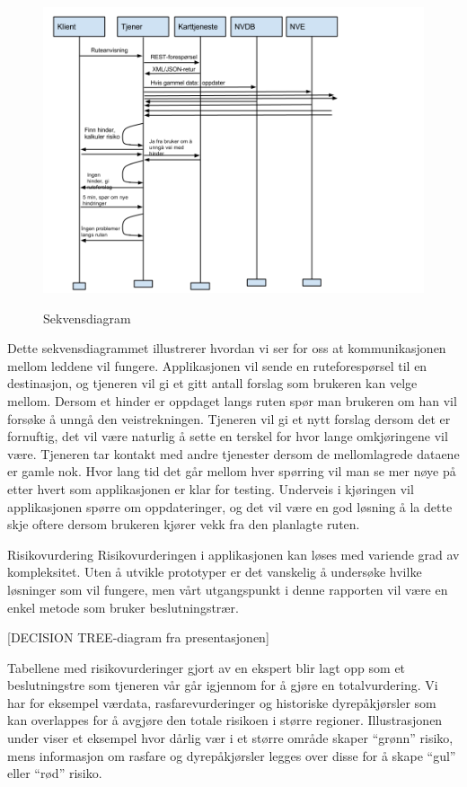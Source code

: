 \documentclass[a4paper,norsk,oneside]{book}
\begin{document}
\begin{figure}[H]
\centering
\includegraphics[scale=0.5]{figs/Sekvensdiagram.png}
\label{sekvensdiagram}
\caption{Sekvensdiagram}
\end{figure}

Dette sekvensdiagrammet illustrerer hvordan vi ser for oss at kommunikasjonen mellom leddene vil fungere. Applikasjonen vil sende en ruteforespørsel til en destinasjon, og tjeneren vil gi et gitt antall forslag som brukeren kan velge mellom. Dersom et hinder er oppdaget langs ruten spør man brukeren om han vil forsøke å unngå den veistrekningen. Tjeneren vil gi et nytt forslag dersom det er fornuftig, det vil være naturlig å sette en terskel for hvor lange omkjøringene vil være.
Tjeneren tar kontakt med andre tjenester dersom de mellomlagrede dataene er gamle nok. Hvor lang tid det går mellom hver spørring vil man se mer nøye på etter hvert som applikasjonen er klar for testing.
Underveis i kjøringen vil applikasjonen spørre om oppdateringer, og det vil være en god løsning å la dette skje oftere dersom brukeren kjører vekk fra den planlagte ruten.

Risikovurdering
Risikovurderingen i applikasjonen kan løses med variende grad av kompleksitet. Uten å utvikle prototyper er det vanskelig å undersøke hvilke løsninger som vil fungere, men vårt utgangspunkt i denne rapporten vil være en enkel metode som bruker beslutningstrær.

[DECISION TREE-diagram fra presentasjonen]

Tabellene med risikovurderinger gjort av en ekspert blir lagt opp som et beslutningstre som tjeneren vår går igjennom for å gjøre en totalvurdering. Vi har for eksempel værdata, rasfarevurderinger og historiske dyrepåkjørsler som kan overlappes for å avgjøre den totale risikoen i større regioner. Illustrasjonen under viser et eksempel hvor dårlig vær i et større område skaper “grønn” risiko, mens informasjon om rasfare og dyrepåkjørsler legges over disse for å skape “gul” eller “rød” risiko.
\end{document}
